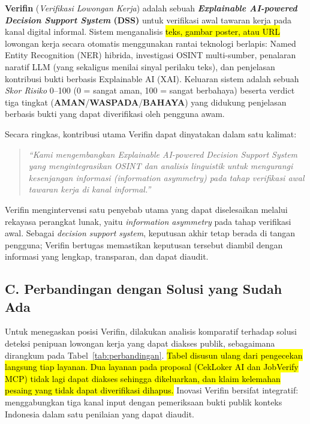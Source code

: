 \documentclass[12pt,a4paper]{article}
\newcommand{\revisi}[1]{\hl{#1}}
\begin{document}
\textbf{Verifin} (\textit{Verifikasi Lowongan Kerja}) adalah sebuah \textbf{\textit{Explainable
AI-powered Decision Support System} (DSS)} untuk verifikasi awal tawaran kerja pada kanal digital
informal. Sistem menganalisis \revisi{teks, gambar poster, atau URL} lowongan kerja secara otomatis menggunakan rantai
teknologi berlapis: Named Entity Recognition (NER) hibrida, investigasi
OSINT multi-sumber, penalaran naratif LLM (yang sekaligus menilai sinyal perilaku teks), dan
penjelasan kontribusi bukti berbasis Explainable
AI (XAI).
Keluaran sistem adalah sebuah \textit{Skor Risiko} 0--100 (0 = sangat aman, 100 = sangat berbahaya)
beserta verdict tiga tingkat (\textbf{AMAN}/\textbf{WASPADA}/\textbf{BAHAYA}) yang didukung penjelasan berbasis bukti yang
dapat diverifikasi oleh pengguna awam.

Secara ringkas, kontribusi utama Verifin dapat dinyatakan dalam satu kalimat:

\begin{quote}
\itshape ``Kami mengembangkan \textit{Explainable AI-powered Decision Support System} yang
mengintegrasikan OSINT dan analisis linguistik untuk mengurangi kesenjangan informasi
(\textit{information asymmetry}) pada tahap verifikasi awal tawaran kerja di kanal informal.''
\end{quote}

Verifin mengintervensi satu penyebab utama yang dapat diselesaikan melalui
rekayasa perangkat lunak, yaitu \textit{information asymmetry} pada tahap verifikasi awal. Sebagai
\textit{decision support system}, keputusan akhir tetap berada di tangan pengguna; Verifin
bertugas memastikan keputusan tersebut diambil dengan informasi yang lengkap, transparan, dan
dapat diaudit.

\subsection*{C. Perbandingan dengan Solusi yang Sudah Ada}

Untuk menegaskan posisi Verifin, dilakukan analisis komparatif terhadap solusi deteksi penipuan lowongan kerja yang dapat diakses publik, sebagaimana dirangkum pada Tabel~\ref{tab:perbandingan}. \revisi{Tabel disusun ulang dari pengecekan langsung tiap layanan. Dua layanan pada proposal (CekLoker AI dan JobVerify MCP) tidak lagi dapat diakses sehingga dikeluarkan, dan klaim kelemahan pesaing yang tidak dapat diverifikasi dihapus.} Inovasi Verifin bersifat integratif: menggabungkan tiga kanal input dengan pemeriksaan bukti publik konteks Indonesia dalam satu penilaian yang dapat diaudit.
\end{document}
